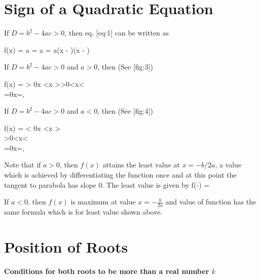 \section{Sign of a Quadratic Equation}
If $D = b^2 - 4ac > 0$, then eq. [eq:1] can be written as

\startformula f(x) = a\stopformula
\startformula = a\stopformula
\startformula = a(x - \alpha)(x - \beta)\stopformula

If $D = b^2 - 4ac > 0$ and $a > 0$, then (See [fig:3])

\startformula f(x) = \startmathcases > 0x <\alpha{}x
  >\beta\NR>0\alpha<x<\beta\\=0x=\alpha,\beta\NR\stopmathcases\stopformula

\startplacefigure[title={When $D > 0$ and $a > 0$}, reference=fig:3]
\stopplacefigure

If $D = b^2 - 4ac > 0$ and $a < 0$, then (See [fig:4])

\startformula f(x) = \startmathcases < 0x <\alpha{}x
  >\beta\\>0\alpha<x<\beta\\=0x=\alpha,\beta\stopmathcases\stopformula

Note that if $a > 0$, then $f(x)$ attains the least value at $x = -b/2a$, a value which is achieved by differentiating the function
once and at this point the tangent to parabola has slope $0$. The least value is given by
\startformula f\left(-\right) = \stopformula

If $a < 0$, then $f(x)$ is maximum at value $x = -\frac{b}{2a}$ and value of function has the same formula which is for least value
shown above.


\startplacefigure[title={When $D > 0$ and $a < 0$}, reference=fig:4]
\stopplacefigure


\section{Position of Roots}
{\bf Conditions for both roots to be more than a real number $k$}

\startplacefigure[title={When $D > 0$ and $a > 0$}, reference=fig:5]
\stopplacefigure

